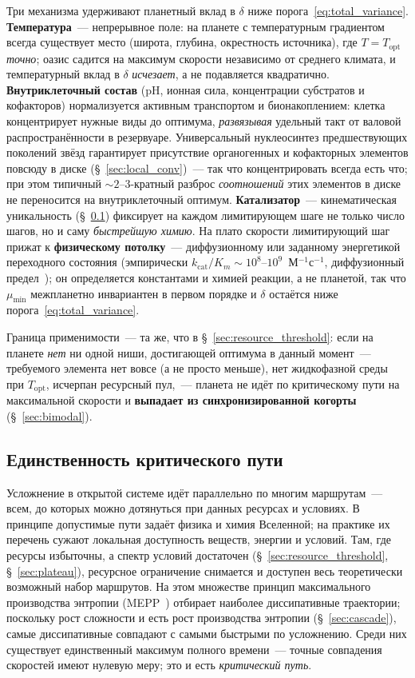 \documentclass[12pt,a4paper]{article}
\begin{document}
Три механизма удерживают планетный вклад в $\delta$ ниже порога~\eqref{eq:total_variance}. \textbf{Температура}~--- непрерывное поле: на
планете с температурным градиентом всегда существует место (широта, глубина,
окрестность источника), где $T = T_{\mathrm{opt}}$ \emph{точно}; оазис садится на
максимум скорости независимо от среднего климата, и температурный вклад в $\delta$
\emph{исчезает}, а не подавляется квадратично. \textbf{Внутриклеточный состав}
(pH, ионная сила, концентрации субстратов и кофакторов) нормализуется активным
транспортом и бионакоплением: клетка концентрирует нужные виды до оптимума,
\emph{развязывая} удельный такт от валовой распространённости в резервуаре.
Универсальный нуклеосинтез предшествующих поколений звёзд гарантирует присутствие
органогенных и кофакторных элементов повсюду в диске
(\S~\ref{sec:local_conv})~--- так что концентрировать всегда есть что; при этом
типичный $\sim 2$--$3$-кратный разброс \emph{соотношений} этих элементов в диске
не переносится на внутриклеточный оптимум. \textbf{Катализатор}~--- кинематическая уникальность
(\S~\ref{sec:uniqueness}) фиксирует на каждом лимитирующем шаге не только число
шагов, но и саму \emph{быстрейшую химию}. На плато скорости лимитирующий шаг прижат к
\textbf{физическому потолку}~--- диффузионному или заданному энергетикой
переходного состояния (эмпирически $k_{\mathrm{cat}}/K_m\sim10^{8}$--$10^{9}$~М$^{-1}$с$^{-1}$,
диффузионный предел~\cite{Bar-Even2011}); он определяется константами и химией
реакции, а не планетой, так что $\mu_{\min}$ межпланетно инвариантен в первом
порядке и $\delta$ остаётся ниже порога~\eqref{eq:total_variance}.

Граница применимости~--- та же, что в \S~\ref{sec:resource_threshold}: если на
планете \emph{нет} ни одной ниши, достигающей оптимума в данный момент~---
требуемого элемента нет вовсе (а не просто меньше), нет
жидкофазной среды при $T_{\mathrm{opt}}$, исчерпан ресурсный пул,~--- планета не идёт по критическому
пути на максимальной скорости и \textbf{выпадает из синхронизированной когорты}
(\S~\ref{sec:bimodal}).

\subsection{Единственность критического пути}
\label{sec:uniqueness}

Усложнение в открытой системе идёт параллельно по многим маршрутам~--- всем, до которых можно дотянуться при данных ресурсах и условиях. В принципе допустимые пути задаёт физика и химия Вселенной; на практике их перечень сужают локальная доступность веществ, энергии и условий. Там, где ресурсы избыточны, а спектр условий достаточен (\S~\ref{sec:resource_threshold}, \S~\ref{sec:plateau}), ресурсное ограничение снимается и доступен весь теоретически возможный набор маршрутов. На этом множестве принцип максимального производства энтропии (MEPP~\cite{Martyushev,MartyushevSeleznev2006,Kleidon2010,Vallino2010}) отбирает наиболее диссипативные траектории; поскольку рост сложности и есть рост производства энтропии (\S~\ref{sec:cascade}), самые диссипативные совпадают с самыми быстрыми по усложнению. Среди них существует единственный максимум полного времени~--- точные совпадения скоростей имеют нулевую меру; это и есть \emph{критический путь}.
\end{document}
